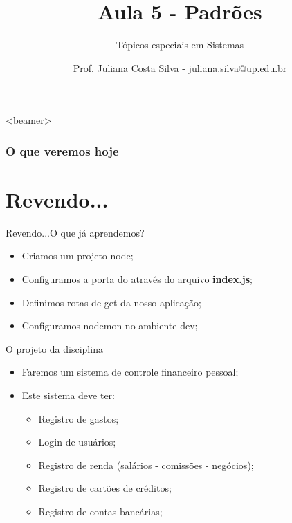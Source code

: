\documentclass{beamer}
\title{Aula 5  - Padrões}
\subtitle{Tópicos especiais em Sistemas}
\author{Prof. Juliana Costa Silva - juliana.silva@up.edu.br}
\begin{document}
  \frame[c]{\maketitle}
      \begin{frame}<beamer>
      \frametitle{O que veremos hoje}
      \tableofcontents
    \end{frame}
    \section{Revendo...}
    \begin{frame}{Revendo...}{O que já aprendemos?}
      
      \begin{itemize}
            \item Criamos um projeto node;
            \item Configuramos a porta do através do arquivo \textbf{index.js};
            \item Definimos rotas de get da nosso aplicação;
            \item Configuramos nodemon no ambiente dev;
       \end{itemize}
     \end{frame}
\begin{frame}[label=proof]{O projeto da disciplina}
	\begin{itemize}
	\item Faremos um sistema de controle financeiro pessoal;
	\item Este sistema deve ter:
	\begin{itemize}
	\item Registro de gastos;
	\item Login de usuários;
	\item Registro de renda (salários - comissões - negócios);
	\item Registro de cartões de créditos;
	\item Registro de contas bancárias;
	\end{itemize}
	\end{itemize}
    \end{frame}
\end{document}
